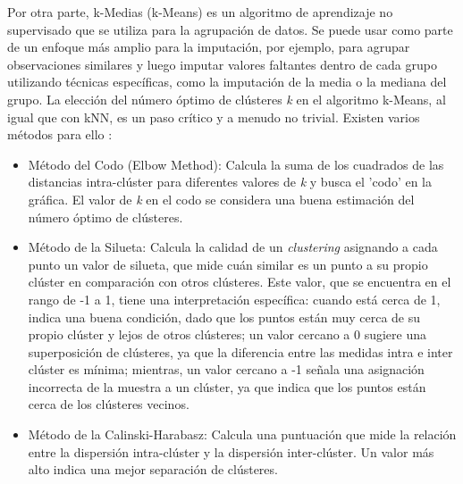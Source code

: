 Por otra parte, k-Medias (k-Means) es un algoritmo de aprendizaje no supervisado que se utiliza para la agrupación de datos. Se puede usar como parte de un enfoque más amplio para la imputación, por ejemplo, para agrupar observaciones similares y luego imputar valores faltantes dentro de cada grupo utilizando técnicas específicas, como la imputación de la media o la mediana del grupo. La elección del número óptimo de clústeres \textit{k} en el algoritmo k-Means, al igual que con kNN, es un paso crítico y a menudo no trivial. Existen varios métodos para ello \citep{bonaccorso2017machine}:

\begin{itemize}
	\item Método del Codo (Elbow Method): Calcula la suma de los cuadrados de las distancias intra-clúster para diferentes valores de \textit{k} y busca el 'codo' en la gráfica.  El valor de \textit{k} en el codo se considera una buena estimación del número óptimo de clústeres.
    \item Método de la Silueta: Calcula la calidad de un \textit{clustering} asignando a cada punto un valor de silueta, que mide cuán similar es un punto a su propio clúster en comparación con otros clústeres. Este valor, que se encuentra en el rango de -1 a 1, tiene una interpretación específica: cuando está cerca de 1, indica una buena condición, dado que  los puntos están muy cerca de su propio clúster y lejos de otros clústeres; un valor cercano a 0 sugiere una superposición de clústeres, ya que la diferencia entre las medidas intra e inter clúster es mínima; mientras, un valor cercano a -1 señala una asignación incorrecta de la muestra a un clúster, ya que indica que los puntos están cerca de los clústeres vecinos.
    \item Método de la Calinski-Harabasz: Calcula una puntuación que mide la relación entre la dispersión intra-clúster y la dispersión inter-clúster. Un valor más alto indica una mejor separación de clústeres.
\end{itemize}

